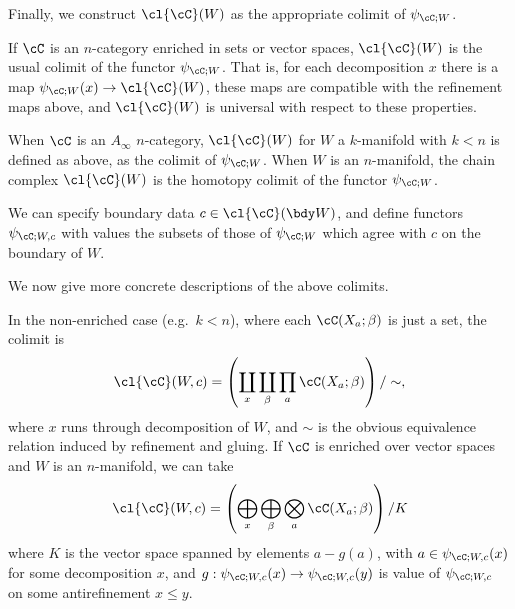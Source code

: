 Finally, we construct $\cl{\cC}(W)$ as the appropriate colimit of $\psi_{\cC;W}$.

\begin{defn}
\label{def:colim-fields}
If $\cC$ is an $n$-category enriched in sets or vector spaces, $\cl{\cC}(W)$ is the usual colimit of the functor $\psi_{\cC;W}$.
That is, for each decomposition $x$ there is a map
$\psi_{\cC;W}(x)\to \cl{\cC}(W)$, these maps are compatible with the refinement maps
above, and $\cl{\cC}(W)$ is universal with respect to these properties.
\end{defn}

\begin{defn}
When $\cC$ is an $A_\infty$ $n$-category, $\cl{\cC}(W)$ for $W$ a $k$-manifold with $k < n$ 
is defined as above, as the colimit of $\psi_{\cC;W}$.
When $W$ is an $n$-manifold, the chain complex $\cl{\cC}(W)$ is the homotopy colimit of the functor $\psi_{\cC;W}$.
\end{defn}

We can specify boundary data $c \in \cl{\cC}(\bdy W)$, and define functors $\psi_{\cC;W,c}$ 
with values the subsets of those of $\psi_{\cC;W}$ which agree with $c$ on the boundary of $W$.

We now give more concrete descriptions of the above colimits.

In the non-enriched case (e.g.\ $k<n$), where each $\cC(X_a; \beta)$ is just a set,
the colimit is
\[
	\cl{\cC}(W,c) = \left( \coprod_x \coprod_\beta \prod_a \cC(X_a; \beta) \right) / \sim ,
\]
where $x$ runs through decomposition of $W$, and $\sim$ is the obvious equivalence relation 
induced by refinement and gluing.
If $\cC$ is enriched over vector spaces and $W$ is an $n$-manifold, 
we can take
\begin{equation*}
	\cl{\cC}(W,c) = \left( \bigoplus_x \bigoplus_\beta \bigotimes_a \cC(X_a; \beta) \right) / K
\end{equation*}
where $K$ is the vector space spanned by elements $a - g(a)$, with
$a\in \psi_{\cC;W,c}(x)$ for some decomposition $x$, and $g: \psi_{\cC;W,c}(x)
\to \psi_{\cC;W,c}(y)$ is value of $\psi_{\cC;W,c}$ on some antirefinement $x \leq y$.

